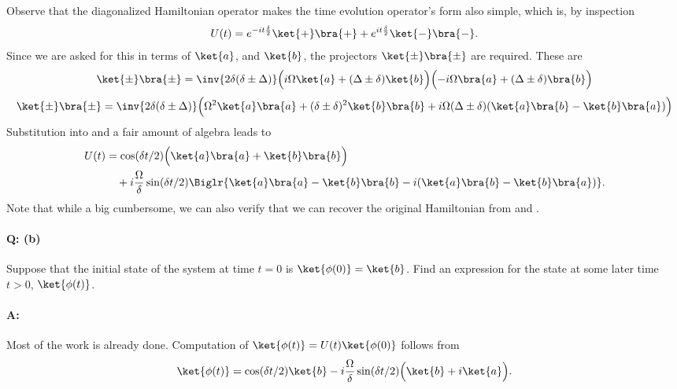 {Observe that the diagonalized Hamiltonian operator makes the time evolution operator's form also simple, which is, by inspection
%
\begin{equation}\label{eqn:qmIexamPractice2008Dec:2:80}
U(t) =
e^{-i t \frac{\delta}{2}} \ket{+}\bra{+}
+ e^{i t \frac{\delta}{2}} \ket{-}\bra{-}.
\end{equation}
%
Since we are asked for this in terms of \(\ket{a}\), and \(\ket{b}\), the projectors \(\ket{\pm}\bra{\pm}\) are required.  These are
%
\begin{equation}\label{eqn:qmIexamPractice2008Dec:690}
\begin{aligned}
\ket{\pm}\bra{\pm}
&= \inv{2 \delta (\delta \pm \Delta)}
\Bigl( i \Omega \ket{a} + (\Delta \pm \delta) \ket{b} \Bigr)
\Bigl( -i \Omega \bra{a} + (\Delta \pm \delta) \bra{b} \Bigr) \\
\end{aligned}
\end{equation}
%
\begin{equation}\label{eqn:qmIexamPractice2008Dec:2:90}
\ket{\pm}\bra{\pm}
= \inv{2 \delta (\delta \pm \Delta)}
\Bigl(
\Omega^2 \ket{a}\bra{a}
+(\delta \pm \delta)^2 \ket{b}\bra{b}
+i \Omega (\Delta \pm \delta) (
\ket{a}\bra{b}
-\ket{b}\bra{a}
)
\Bigr)
\end{equation}
%
Substitution into  and a fair amount of algebra leads to
\begin{equation}\label{eqn:qmIexamPractice2008Dec:2:100}
\begin{aligned}
U(t) &= \cos(\delta t/2) \Bigl( \ket{a}\bra{a} + \ket{b}\bra{b} \Bigr) \\
&\quad
+ i \frac{\Omega}{\delta} \sin(\delta t/2) \Biglr{
\ket{a}\bra{a} - \ket{b}\bra{b}
-i (\ket{a}\bra{b} - \ket{b}\bra{a} )
}.
\end{aligned}
\end{equation}
Note that while a big cumbersome, we can also verify that we can recover the original Hamiltonian from  and .

\paragraph{Q: (b)}
Suppose that the initial state of the system at time \(t = 0\) is \(\ket{\phi(0)}= \ket{b}\).  Find an expression for the state at some later time \(t > 0\), \(\ket{\phi(t)}\).
\paragraph{A:}
Most of the work is already done.  Computation of \(\ket{\phi(t)} = U(t) \ket{\phi(0)}\) follows from 
\begin{equation}\label{eqn:qmIexamPractice2008Dec:2:110}
\ket{\phi(t)} =
\cos(\delta t/2) \ket{b}
- i \frac{\Omega}{\delta} \sin(\delta t/2) \Bigl(
\ket{b} +i \ket{a}
\Bigr).
\end{equation}
%
}
